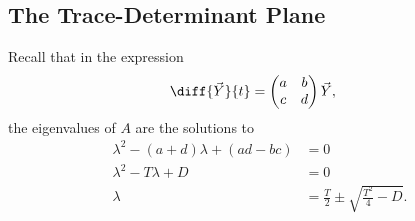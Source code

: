 \documentclass[10pt]{mypackage}
\begin{document}
\subsection{The Trace-Determinant Plane}%
Recall that in the expression
\begin{align*}
  \diff{\vec{Y}}{t} &= \begin{pmatrix}a & b \\ c & d\end{pmatrix} \vec{Y},
\end{align*}
the eigenvalues of $A$ are the solutions to
\begin{align*}
  \lambda^2 - \left(a + d\right)\lambda + \left(ad - bc\right) &= 0\\
  \lambda^2 - T\lambda + D &= 0\\
  \lambda &= \frac{T}{2} \pm \sqrt{\frac{T^2}{4} - D}.
\end{align*}
\end{document}
